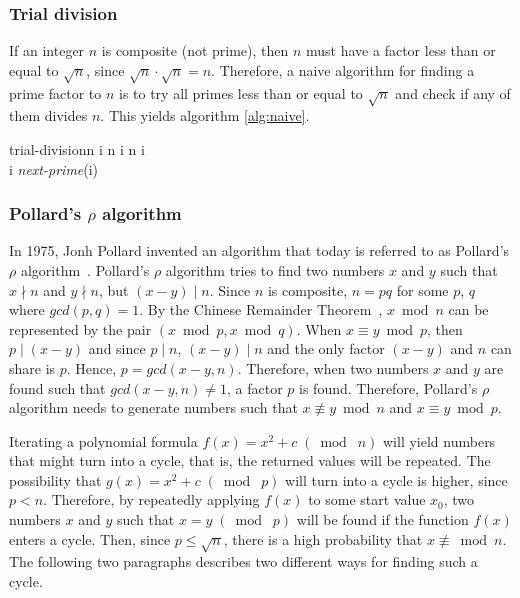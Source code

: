 \subsubsection{Trial division}
\label{sec:trial-division}
If an integer $n$ is composite (not prime), then $n$ must have a factor less
than or equal to $\sqrt n$, since $\sqrt n \cdot \sqrt n = n$. Therefore, a
naive algorithm for finding a prime factor to $n$ is to try all primes
less than or equal to $\sqrt n$ and check if any of them divides $n$. This
yields algorithm \ref{alg:naive}.

\begin{pseudocode}{trial-division}{n}
\label{alg:naive}
\FOR i  \TO \sqrt n \DO
    \BEGIN
        \IF i \mid n \THEN \RETURN i \\
        i \GETS \textit{next-prime}(i)
    \END
\end{pseudocode}

\subsubsection{Pollard's $\rho$ algorithm}
\label{sec:pollard-rho}
In 1975, Jonh Pollard invented an algorithm that today is referred to as
Pollard's $\rho$ algorithm~\cite{wiki:pollard}. Pollard's $\rho$ algorithm
tries to find two numbers $x$ and $y$ such that $x \nmid n$ and $y \nmid n$, 
but $(x - y) \mid n$. Since $n$ is composite, $n = pq$ for some $p$,
$q$ where $gcd(p,q) = 1$.  By the Chinese Remainder Theorem~\cite{wiki:crt}, 
$x \bmod n$ can be
represented by the pair $(x \bmod p, x \bmod q)$. When $x \equiv y \bmod p$,
then
$p \mid (x - y)$ and since $p \mid n$, $(x - y) \mid n$ and the only factor 
$(x - y)$ and $n$ can share is $p$. Hence, $p = gcd(x-y, n)$. 
Therefore, when two
numbers $x$ and $y$ are found such that $gcd(x - y, n) \neq 1$, a factor $p$
is found. Therefore, Pollard's $\rho$ algorithm needs to generate numbers such
that $x \not \equiv y \bmod n$ and $x \equiv y \bmod p$.

Iterating a polynomial formula $f(x) = x^2 + c \; (\bmod \; n)$ will yield 
numbers that might turn into a cycle, that is, the returned values will be
repeated. The possibility that $g(x) = x^2  + c \; (\bmod \; p)$ 
will turn into a
cycle is higher, since $p < n$. Therefore, by repeatedly applying $f(x)$ to
some start value $x_0$, two numbers $x$ and $y$ such that 
$x = y \; (\bmod \; p)$ will be 
found if the function $f(x)$ enters a cycle. Then, since $p \leq \sqrt n$,
there is a high probability that $x \not \equiv \bmod
n$.
The following two paragraphs describes two different ways for
finding such a cycle.


